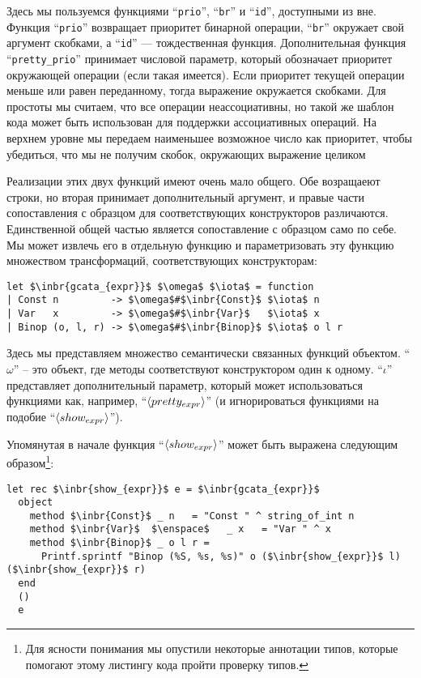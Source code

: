 Здесь мы пользуемся функциями ``\lstinline{prio}'', ``\lstinline{br}'' и ``\lstinline{id}'', доступными из вне. Функция ``\lstinline{prio}''
возвращает приоритет бинарной операции, ``\lstinline{br}'' окружает свой аргумент скобками, а ``\lstinline{id}'' --- тождественная функция.
Дополнительная функция ``\lstinline{pretty_prio}'' принимает числовой параметр, который обозначает приоритет окружающей операции (если такая имеется). Если приоритет текущей операции меньше или равен переданному, тогда выражение окружается скобками. Для простоты мы считаем, что все операции неассоциативны, но такой же шаблон кода может быть использован для поддержки ассоциативных операций.
На верхнем уровне мы передаем наименьшее возможное число как приоритет, чтобы убедиться, что мы не получим скобок, окружающих выражение целиком 

Реализации этих двух функций имеют очень мало общего. Обе возращаеют строки, но вторая принимает дополнительный аргумент, и 
правые части сопоставления с образцом для соответствующих конструкторов различаются. Единственной общей частью является
сопоставление с образцом само по себе. Мы может извлечь его в отдельную функцию и параметризовать эту функцию множеством трансформаций, 
соответствующих конструкторам:

\begin{lstlisting}
let $\inbr{gcata_{expr}}$ $\omega$ $\iota$ = function
| Const n         -> $\omega$#$\inbr{Const}$ $\iota$ n
| Var   x         -> $\omega$#$\inbr{Var}$   $\iota$ x
| Binop (o, l, r) -> $\omega$#$\inbr{Binop}$ $\iota$ o l r
\end{lstlisting}

Здесь мы представляем множество семантически связанных функций объектом. ``$\omega$'' -- это объект, где методы соответствуют конструктором
один к одному. ``$\iota$'' представляет дополнительный параметр, который может использоваться функциями как, например, ``$\left<pretty_{expr}\right>$'' (и игнорироваться функциями на подобие ``$\left<show_{expr}\right>$'').

Упомянутая в начале функция ``$\left<show_{expr}\right>$'' может быть выражена следующим образом\footnote{Для ясности понимания мы опустили некоторые аннотации типов, которые помогают этому листингу кода пройти проверку типов.}:

\begin{lstlisting}
let rec $\inbr{show_{expr}}$ e = $\inbr{gcata_{expr}}$
  object
    method $\inbr{Const}$ _ n   = "Const " ^ string_of_int n
    method $\inbr{Var}$  $\enspace$   _ x   = "Var " ^ x
    method $\inbr{Binop}$ _ o l r =
      Printf.sprintf "Binop (%S, %s, %s)" o ($\inbr{show_{expr}}$ l) ($\inbr{show_{expr}}$ r)
  end
  ()
  e
\end{lstlisting}

